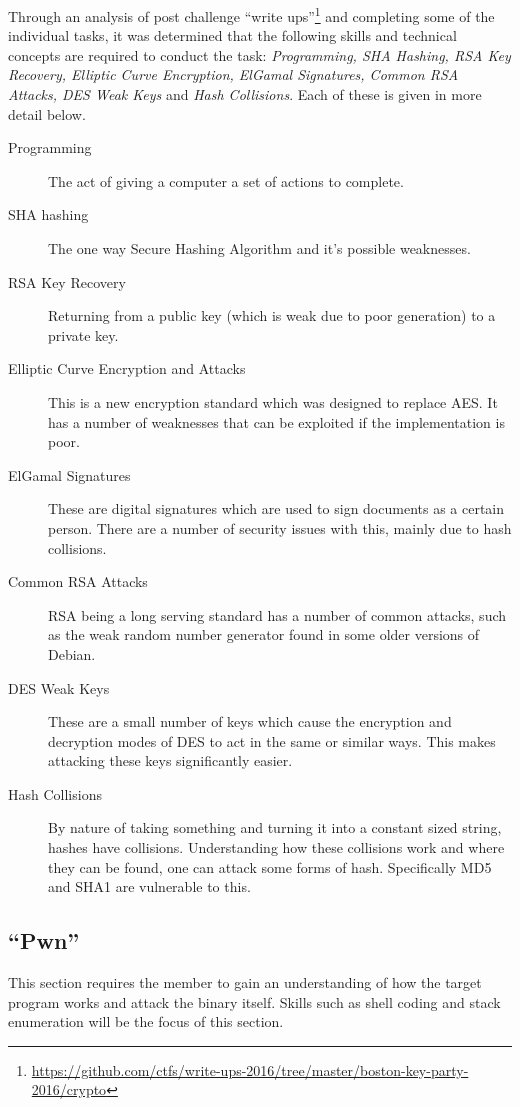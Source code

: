 \documentclass[a4paper,11pt]{report}
\begin{document}
			Through an analysis of post challenge ``write ups''\footnote{\url{https://github.com/ctfs/write-ups-2016/tree/master/boston-key-party-2016/crypto}}
			and completing some of the individual tasks, 
			it was determined that the following skills and technical concepts are required to conduct the task: 
			\textit{Programming, SHA Hashing, RSA Key Recovery, Elliptic Curve Encryption, ElGamal Signatures, Common RSA Attacks, DES Weak Keys} and \textit{Hash Collisions}.
			Each of these is given in more detail below. 
			\begin{description}
				\item[Programming]
					The act of giving a computer a set of actions to complete. 
				\item[SHA hashing] 
					The one way Secure Hashing Algorithm and it's possible weaknesses. 
				\item[RSA Key Recovery]
					Returning from a public key (which is weak due to poor generation) to a private key. 
				\item[Elliptic Curve Encryption and Attacks]
					This is a new encryption standard which was designed to replace AES. 
					It has a number of weaknesses that can be exploited if the implementation is poor. 
				\item[ElGamal Signatures]
					These are digital signatures which are used to sign documents as a certain person. 
					There are a number of security issues with this, mainly due to hash collisions. 
				\item[Common RSA Attacks] 
					RSA being a long serving standard has a number of common attacks, such as the weak random number generator found in some older versions of Debian. 
				\item[DES Weak Keys] 
					These are a small number of keys which cause the encryption and decryption modes of DES to act in the same or similar ways. 
					This makes attacking these keys significantly easier. 
				\item[Hash Collisions]
					By nature of taking something and turning it into a constant sized string, hashes have collisions. 
					Understanding how these collisions work and where they can be found, one can attack some forms of hash. 
					Specifically MD5 and SHA1 are vulnerable to this. 
			\end{description}
		\subsection{``Pwn''}
			This section requires the member to gain an understanding of how the target program works and attack the binary itself. 
			Skills such as shell coding and stack enumeration will be the focus of this section. 
\end{document}
